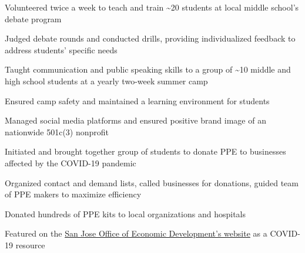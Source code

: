 \documentclass[letterpaper]{resume-shreeram}
\begin{document}
\begin{compactitem}
    \item Volunteered twice a week to teach and train
      \textasciitilde{}20 students at local middle school's debate
      program

    \item Judged debate rounds and conducted drills, providing
      individualized feedback to address students' specific needs
\end{compactitem}

\begin{compactitem}
    \item Taught communication and public speaking skills to a group of
      \textasciitilde{}10 middle and high school students at a yearly
      two-week summer camp

    \item Ensured camp safety and maintained a learning environment for
      students
\end{compactitem}

\begin{compactitem}
    \item Managed social media platforms and ensured positive brand
      image of an nationwide 501c(3) nonprofit
\end{compactitem}

\begin{compactitem}
    \item Initiated and brought together group of students to donate PPE
      to businesses affected by the COVID-19 pandemic

    \item Organized contact and demand lists, called businesses for
      donations, guided team of PPE makers to maximize efficiency

    \item Donated hundreds of PPE kits to local organizations and
      hospitals

    \item Featured on the
      \href{https://www.sjeconomy.com/why-san-jose/covid-19-guidance/local-suppliers}{San
      Jose Office of Economic Development's website} as a COVID-19
      resource
\end{compactitem}
\end{document}
